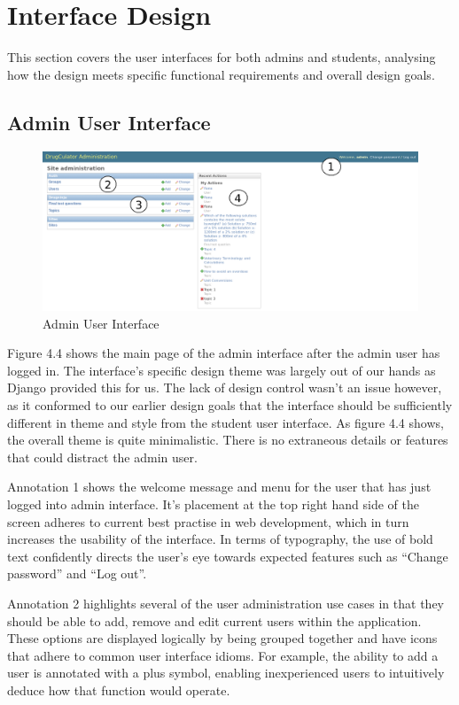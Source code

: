 \documentclass{l3proj}
\begin{document}
\section{Interface Design}

This section covers the user interfaces for both admins and students, analysing how the design meets specific functional requirements and overall design goals.

\subsection{Admin User Interface}

\begin{figure}[!htb]
\caption{Admin User Interface}
\includegraphics[width=\linewidth]{images/admin_interface1.png}
\end{figure}

Figure 4.4 shows the main page of the admin interface after the admin user has logged in. The interface's specific design theme was largely out of our hands as Django provided this for us. The lack of design control wasn't an issue however, as it conformed to our earlier design goals that the interface should be sufficiently different in theme and style from the student user interface. As figure 4.4 shows, the overall theme is quite minimalistic. There is no extraneous details or features that could distract the admin user.

Annotation 1 shows the welcome message and menu for the user that has just logged into admin interface. It's placement at the top right hand side of the screen adheres to current best practise in web development, which in turn increases the usability of the interface. In terms of typography, the use of bold text confidently directs the user's eye towards expected features such as ``Change password'' and ``Log out''.

Annotation 2 highlights several of the user administration use cases in that they should be able to add, remove and edit current users within the application. These options are displayed logically by being grouped together and have icons that adhere to common user interface idioms. For example, the ability to add a user is annotated with a plus symbol, enabling inexperienced users to intuitively deduce how that function would operate. 
\end{document}
